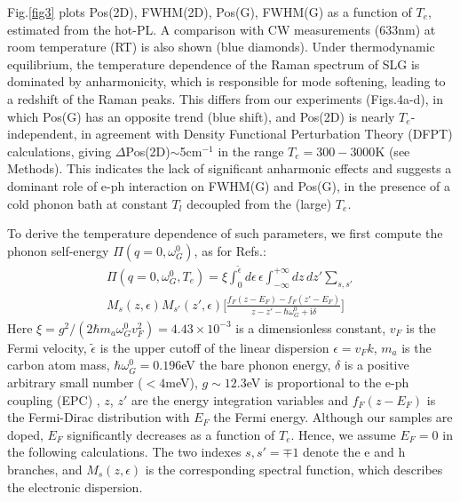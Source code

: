 \documentclass[aps, prl,twocolumn]{revtex4}
\begin{document}
Fig.\ref{fig3} plots Pos(2D), FWHM(2D), Pos(G), FWHM(G) as a function of $T_e$, estimated from the hot-PL. A comparison with CW measurements (633nm) at room temperature (RT) is also shown (blue diamonds). Under thermodynamic equilibrium, the temperature dependence of the Raman spectrum of SLG is dominated by anharmonicity, which is responsible for mode softening, leading to a redshift of the Raman peaks\cite{Apostolov,Basko2008, Bonini2007}. This differs from our experiments (Figs.4a-d), in which Pos(G) has an opposite trend (blue shift), and Pos(2D) is nearly $T_e$-independent, in agreement with Density Functional Perturbation Theory (DFPT) calculations, giving $\Delta$Pos(2D)$\sim$5cm$^{-1}$ in the range $T_e=300-3000$K (see Methods). This indicates the lack of significant anharmonic effects and suggests a dominant role of e-ph interaction on FWHM(G) and Pos(G), in the presence of a cold phonon bath at constant $T_l$ decoupled from the (large) $T_e$.

To derive the temperature dependence of such parameters, we first compute the phonon self-energy $\Pi(q=0,\omega_G^0)$, as for Refs.\cite{Piscanec2004,LazzeriPRL06, Pisana2007}:
\begin{multline}
\Pi(q=0,\omega^0_G,T_e)=\xi  \int_{0}^{\tilde\epsilon} d\epsilon \, \epsilon  \int_{-\infty}^{+\infty} dz \, dz'\sum_{s,s'} \\M_s(z,\epsilon)M_{s'}(z',\epsilon) \bigg[\frac{f_F(z-E_F)-f_F(z'-E_F)}{z-z'-\hbar\omega_G^0+\mathrm{i} \delta}\bigg]
\label{EqSE}
\end{multline}
Here $\xi= g^2/(2\hbar m_a \omega_G^0 v_F^2)=4.43 \times 10^{-3}$ is a dimensionless constant, $v_F$ is the Fermi velocity, $\tilde\epsilon$ is the upper cutoff of the linear dispersion $\epsilon=v_F k$, $m_a$ is the  carbon atom mass, $\hbar\omega_G^0=0.196$eV the bare phonon energy, $\delta$ is a positive arbitrary small number ($<4$meV), $g\sim12.3$eV is proportional to the e-ph coupling (EPC) \cite{Piscanec2004, Lazzeri2005, LazzeriPRL06,Ferrari200747}, $z$, $z'$ are the energy integration variables and  $f_F(z-E_F)$ is the Fermi-Dirac distribution with $E_F$ the Fermi energy. Although our samples are doped, $E_F$ significantly decreases as a function of $T_e$\cite{Chae2010}. Hence, we assume $E_F=0$ in the following calculations. The two indexes $s,s' = \mp 1$ denote the e and h branches, and $M_s(z,\epsilon)$ is the corresponding spectral function, which describes the electronic dispersion.
\end{document}
